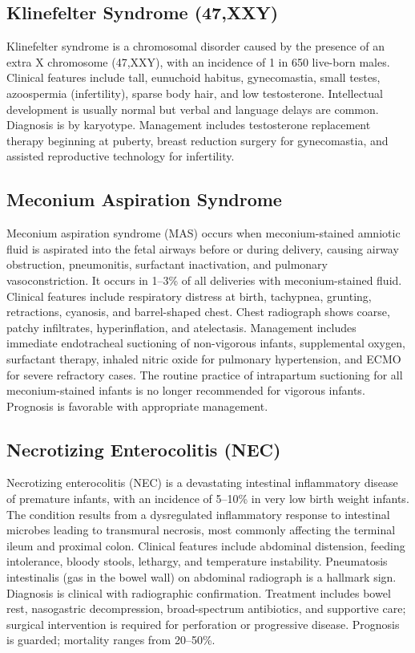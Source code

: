 \subsection{Klinefelter Syndrome (47,XXY)}
\label{sec:Klinefelter Syndrome}
Klinefelter syndrome is a chromosomal disorder caused by the presence of an extra X chromosome (47,XXY), with an incidence of 1 in 650 live-born males. Clinical features include tall, eunuchoid habitus, gynecomastia, small testes, azoospermia (infertility), sparse body hair, and low testosterone. Intellectual development is usually normal but verbal and language delays are common. Diagnosis is by karyotype. Management includes testosterone replacement therapy beginning at puberty, breast reduction surgery for gynecomastia, and assisted reproductive technology for infertility.

\subsection{Meconium Aspiration Syndrome}
\label{sec:Meconium Aspiration Syndrome}
Meconium aspiration syndrome (MAS) occurs when meconium-stained amniotic fluid is aspirated into the fetal airways before or during delivery, causing airway obstruction, pneumonitis, surfactant inactivation, and pulmonary vasoconstriction. It occurs in 1--3\% of all deliveries with meconium-stained fluid. Clinical features include respiratory distress at birth, tachypnea, grunting, retractions, cyanosis, and barrel-shaped chest. Chest radiograph shows coarse, patchy infiltrates, hyperinflation, and atelectasis. Management includes immediate endotracheal suctioning of non-vigorous infants, supplemental oxygen, surfactant therapy, inhaled nitric oxide for pulmonary hypertension, and ECMO for severe refractory cases. The routine practice of intrapartum suctioning for all meconium-stained infants is no longer recommended for vigorous infants. Prognosis is favorable with appropriate management.

\subsection{Necrotizing Enterocolitis (NEC)}
\label{sec:Necrotizing Enterocolitis}
Necrotizing enterocolitis (NEC) is a devastating intestinal inflammatory disease of premature infants, with an incidence of 5--10\% in very low birth weight infants. The condition results from a dysregulated inflammatory response to intestinal microbes leading to transmural necrosis, most commonly affecting the terminal ileum and proximal colon. Clinical features include abdominal distension, feeding intolerance, bloody stools, lethargy, and temperature instability. Pneumatosis intestinalis (gas in the bowel wall) on abdominal radiograph is a hallmark sign. Diagnosis is clinical with radiographic confirmation. Treatment includes bowel rest, nasogastric decompression, broad-spectrum antibiotics, and supportive care; surgical intervention is required for perforation or progressive disease. Prognosis is guarded; mortality ranges from 20--50\%.

